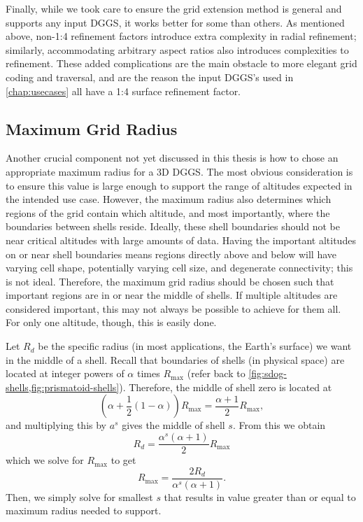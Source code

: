 Finally, while we took care to ensure the grid extension method is general and supports any input DGGS, it works better for some than others.
As mentioned above, non-1:4 refinement factors introduce extra complexity in radial refinement; similarly, accommodating arbitrary aspect ratios also introduces complexities to refinement.
These added complications are the main obstacle to more elegant grid coding and traversal, and are the reason the input DGGS's used in \cref{chap:usecases} all have a 1:4 surface refinement factor.

\subsection{Maximum Grid Radius}
Another crucial component not yet discussed in this thesis is how to chose an appropriate maximum radius for a 3D DGGS.
The most obvious consideration is to ensure this value is large enough to support the range of altitudes expected in the intended use case.
However, the maximum radius also determines which regions of the grid contain which altitude, and most importantly, where the boundaries between shells reside.
Ideally, these shell boundaries should not be near critical altitudes with large amounts of data.
Having the important altitudes on or near shell boundaries means regions directly above and below will have varying cell shape, potentially varying cell size, and degenerate connectivity; this is not ideal.
Therefore, the maximum grid radius should be chosen such that important regions are in or near the middle of shells.
If multiple altitudes are considered important, this may not always be possible to achieve for them all.
For only one altitude, though, this is easily done.

Let $R_d$ be the specific radius (in most applications, the Earth's surface) we want in the middle of a shell.
Recall that boundaries of shells (in physical space) are located at integer powers of $\alpha$ times $R_\mathrm{max}$ (refer back to \cref{fig:sdog-shells,fig:prismatoid-shells}).
Therefore, the middle of shell zero is located at
%
\begin{equation*}
\left( \alpha + \frac{1}{2} (1 -\alpha) \right) R_\mathrm{max} = \frac{ \alpha + 1 }{2} R_\mathrm{max},
\end{equation*}
%
and multiplying this by $a^s$ gives the middle of shell $s$.
From this we obtain
%
\begin{equation*}
R_d = \frac{ \alpha^s \left( \alpha + 1 \right) }{2} R_\mathrm{max}
\end{equation*}
%
which we solve for $R_\mathrm{max}$ to get
%
\begin{equation*}
R_\mathrm{max} = \frac{2 R_d}{ \alpha^s \left( \alpha + 1 \right) }.
\end{equation*}
%
Then, we simply solve for smallest $s$ that results in value greater than or equal to maximum radius needed to support.
